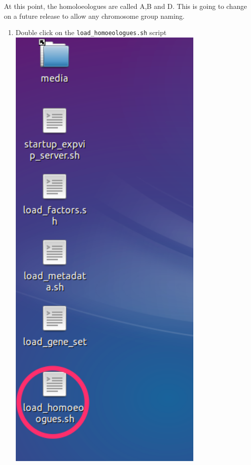 At this point, the homoloeologues are called A,B and D. This is going to
change on a future release to allow any chromosome group naming.

\begin{enumerate}
\def\labelenumi{\arabic{enumi}.}
\itemsep1pt\parskip0pt
\item
  Double click on the \lstinline!load_homoeologues.sh! script
  \\ \includegraphics[width=0.75\textwidth]{expVIP/tutorial/images/LoadHom01.png}

\end{enumerate}
